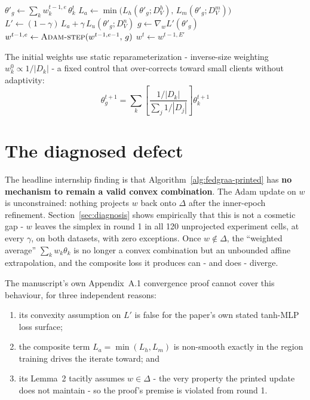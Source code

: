 \documentclass[11pt,a4paper]{report}
\newcommand{\simplex}{\Delta}
\newcommand{\Lprime}{L'}
\begin{document}
\begin{algorithm}[htbp]
\caption{FedGRAA weight update - as printed (defective)}
\label{alg:fedgraa-printed}
\begin{algorithmic}[1]
    \State $\theta'_g \gets \sum_k w_k^{t-1,e}\, \theta_k^t$
    \State $L_a \gets \min\bigl(L_h(\theta'_g; D_V^h),\, L_m(\theta'_g; D_V^m)\bigr)$
    \State $\Lprime \gets (1-\gamma)\, L_a + \gamma\, L_u(\theta'_g; D_V^n)$
    \State $g \gets \nabla_w \Lprime(\theta'_g)$ 
    \State $w^{t-1,e} \gets \Call{Adam-step}{w^{t-1,e-1},\, g}$
  \EndFor
  \State \Return $w^t \gets w^{t-1,E'}$ 
\EndProcedure
\end{algorithmic}
\end{algorithm}

The initial weights use static reparameterization - inverse-size weighting
$w_k^0\propto 1/|D_k|$ - a fixed control that over-corrects toward small
clients without adaptivity:
\begin{equation}
\theta_g^{t+1} = \sum_k \left[\frac{1/|D_k|}{\sum_j 1/|D_j|}\right] \theta_k^{t+1}
\label{eq:static-reparam}
\end{equation}

\section{The diagnosed defect}
\label{sec:fedgraa-defect}

The headline internship finding is that Algorithm~\ref{alg:fedgraa-printed}
has \textbf{no mechanism to remain a valid convex combination}. The Adam
update on $w$ is unconstrained: nothing projects $w$ back onto $\simplex$
after the inner-epoch refinement. Section~\ref{sec:diagnosis} shows
empirically that this is not a cosmetic gap - $w$ leaves the simplex in round
1 in all 120 unprojected experiment cells, at every $\gamma$, on both
datasets, with zero exceptions. Once $w\notin\simplex$, the ``weighted
average'' $\sum_k w_k\theta_k$ is no longer a convex combination but an
unbounded affine extrapolation, and the composite loss it produces can - and
does - diverge.

The manuscript's own Appendix~A.1 convergence proof cannot cover this
behaviour, for three independent reasons:
\begin{enumerate}
\item its convexity assumption on $\Lprime$ is false for the paper's own
stated tanh-MLP loss surface;
\item the composite term $L_a=\min(L_h,L_m)$ is non-smooth exactly in the
region training drives the iterate toward; and
\item its Lemma~2 tacitly assumes $w\in\simplex$ - the very property the
printed update does not maintain - so the proof's premise is violated from
round 1.
\end{enumerate}
\end{document}
